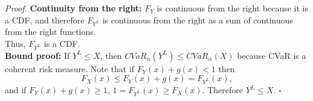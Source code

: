 \documentclass[10pt,a4paper]{amsart}
\newenvironment{proof}{\noindent\textit{Proof.}}{\hfill$\square$}
\begin{document}
\begin{proof}
	\textbf{Continuity from the right:}
	$F_Y$ is continuous from the right because it is a CDF, and therefore $F_{Y^L}$ is continuous from the right as a sum of continuous from the right functions. \\
	Thus, $F_{Y^L}$ is a CDF. \\
	
	\textbf{Bound proof:}
	If $Y^L\leq X$, then $CVaR_\alpha(Y^L)\leq CVaR_\alpha(X)$ because CVaR is a coherent risk measure. Note that 
	if $F_Y(x) + g(x)<1$ then
	$$F_X(x)\leq F_Y(x) + g(x)=F_{Y^L}(x),$$
	and if $F_Y(x) + g(x)\geq 1$, $1=F_{Y^L}(x)\geq F_X(x)$. Therefore $Y^L\leq X$.
\end{proof}
\end{document}
